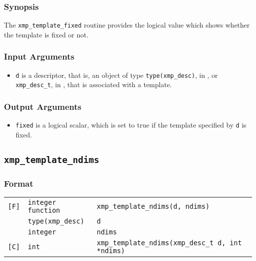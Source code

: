 \subsubsection*{Synopsis}

The {\tt xmp\_template\_fixed} routine provides the logical value which
shows whether the template is fixed or not.


\subsubsection*{Input Arguments}
\begin{itemize}
 \item {\tt d} is a descriptor, that is, an object of type 
       {\tt type(xmp\_desc)}, in {\XMPF}, or {\tt xmp\_desc\_t},
       in {\XMPC}, that is associated with a template.
\end{itemize}

\subsubsection*{Output Arguments}
\begin{itemize}
 \item {\tt fixed} is a logical scalar, which is set to true if the
       template specified by {\tt d} is fixed.
\end{itemize}

\subsection{\tt xmp\_template\_ndims}

\subsubsection*{Format}

\begin{tabular}{lll}

\verb![F]!& {\tt integer function}& {\tt xmp\_template\_ndims(d, ndims)}\\
          & {\tt type(xmp\_desc)} & {\tt d}\\
          & {\tt integer} & {\tt ndims}\\

\verb![C]!&  {\tt int}& {\tt xmp\_template\_ndims(xmp\_desc\_t d, int *ndims)}\\

\end{tabular}

